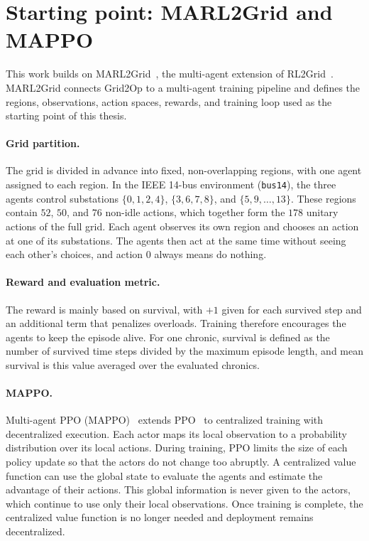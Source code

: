 \section{Starting point: MARL2Grid and MAPPO}
\label{sec:intro-marl2grid}

This work builds on MARL2Grid~\cite{marchesini2026marl2grid}, the multi-agent
extension of RL2Grid~\cite{marchesini2025rl2grid}. MARL2Grid connects Grid2Op to
a multi-agent training pipeline and defines the regions, observations, action
spaces, rewards, and training loop used as the starting point of this thesis.

\paragraph{Grid partition.}
The grid is divided in advance into fixed, non-overlapping regions, with one
agent assigned to each region. In the IEEE 14-bus environment
(\texttt{bus14}), the three agents control substations $\{0,1,2,4\}$,
$\{3,6,7,8\}$, and $\{5,9,\ldots,13\}$. These regions contain $52$, $50$, and
$76$ non-idle actions, which together form the $178$ unitary actions of the full
grid. Each agent observes its own region and chooses an action at one of its
substations. The agents then act at the same time without seeing each other's
choices, and action $0$ always means do nothing.

\paragraph{Reward and evaluation metric.}
The reward is mainly based on survival, with $+1$ given for each survived step
and an additional term that penalizes overloads. Training therefore encourages
the agents to keep the episode alive. For one chronic, survival is defined as
the number of survived time steps divided by the maximum episode length, and
mean survival is this value averaged over the evaluated chronics.

\paragraph{MAPPO.}
Multi-agent PPO (MAPPO)~\cite{yu2022mappo} extends
PPO~\cite{schulman2017ppo} to centralized training with decentralized
execution. Each actor maps its local observation to a probability distribution
over its local actions. During training, PPO limits the size of each policy
update so that the actors do not change too abruptly. A centralized value
function can use the global state to evaluate the agents and estimate the
advantage of their actions. This global information is never given to the
actors, which continue to use only their local observations. Once training is
complete, the centralized value function is no longer needed and deployment
remains decentralized.

